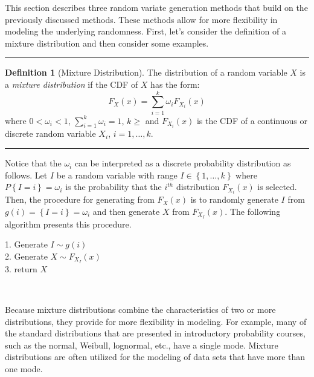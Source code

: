 \documentclass[
]{book}
\theoremstyle{definition}
\newtheorem{definition}{Definition}[chapter]
\theoremstyle{definition}
\theoremstyle{definition}
\theoremstyle{definition}
\theoremstyle{remark}
\begin{document}
This section describes three random variate generation methods that
build on the previously discussed methods. These methods allow for more
flexibility in modeling the underlying randomness. First, let's consider
the definition of a mixture distribution and then consider some
examples.

\begin{center}\rule{0.5\linewidth}{0.5pt}\end{center}

\begin{definition}[Mixture Distribution]
\protect\hypertarget{def:unnamed-chunk-2}{}{\label{def:unnamed-chunk-2} {} }The distribution of
a random variable \(X\) is a \emph{mixture distribution} if the CDF of \(X\) has
the form:
\[
F_{X}(x) = \sum\limits_{i=1}^{k} \omega_{i}F_{X_{i}}(x)
\]
where \(0 < \omega_{i} < 1\), \(\sum\nolimits_{i=1}^{k} \omega_{i} = 1\), \(k \geq\)
and \(F_{X_{i}}(x)\) is the CDF of a continuous or discrete random
variable \(X_{i}\), \(i=1, \ldots, k\).
\end{definition}

\begin{center}\rule{0.5\linewidth}{0.5pt}\end{center}

Notice that the \(\omega_{i}\) can be interpreted as a discrete
probability distribution as follows. Let \(I\) be a random variable with
range \(I \in \left\{ 1, \ldots, k \right\}\) where
\(P\left\{I=i\right\} = \omega_{i}\) is the probability that the \(i^{th}\)
distribution \(F_{X_{i}}(x)\) is selected. Then, the procedure for
generating from \(F_{X}(x)\) is to randomly generate \(I\) from
\(g(i) = \left\{I=i\right\} = \omega_{i}\) and then generate \(X\) from
\(F_{X_{I}}(x)\). The following algorithm presents this procedure.

1. Generate \(I \sim g(i)\)\\
2. Generate \(X \sim F_{X_{I}}(x)\)\\
3. return \(X\)

~

Because mixture distributions combine the characteristics of two or more
distributions, they provide for more flexibility in modeling. For
example, many of the standard distributions that are presented in
introductory probability courses, such as the normal, Weibull,
lognormal, etc., have a single mode. Mixture distributions are often
utilized for the modeling of data sets that have more than one mode.
\end{document}
